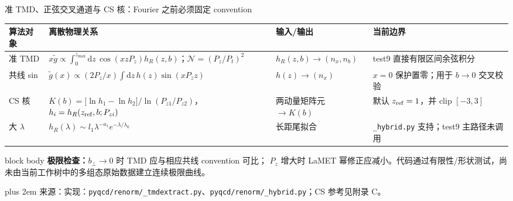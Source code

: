 \documentclass[UTF8,aspectratio=169,11pt]{ctexbeamer}
\newcommand{\source}[1]{%
  \par\vspace{0.02em}\begingroup\fontsize{6}{6.8}\selectfont\raggedright\sloppy
  \setlength{\emergencystretch}{3em}\rightskip=0pt plus 2em
  \color{muted}来源：#1\par\endgroup}
\newcommand{\dd}{\mathrm{d}}
\begin{document}
\begin{frame}[t]{准 TMD、正弦交叉通道与 CS 核：Fourier 之前必须固定 convention}
  \scriptsize
  \begin{tabularx}{0.98\textwidth}{@{}p{}Yp{0.16\textwidth}Y@{}}
    \toprule
    算法对象 & 离散物理关系 & 输入/输出 & 当前边界\\
    \midrule
    准 TMD & \(x\widetilde g\propto\int_0^{z_{\max}}\!\dd z\,\cos(xzP_z)h_R(z,b)\)；\(\mathcal N=(P_z/P_t)^2\) & \(h_R(z,b)\to(n_x,n_b)\) & test9 直接有限区间余弦积分\\
    共线 sin & \(\widetilde g(x)\propto(2P_z/x)\int\dd z\,h(z)\sin(xP_zz)\) & \(h(z)\to(n_x)\) & \(x=0\) 保护置零；用于 \(b\to0\) 交叉校验\\
    CS 核 & \(K(b)=\bigl[\ln h_1-\ln h_2\bigr]/\ln(P_{z1}/P_{z2})\)，\(h_i=h_R(z_{\rm ref},b;P_{zi})\) & 两动量矩阵元 \(\to K(b)\) & 默认 \(z_{\rm ref}=1\)，并 clip \([-3,3]\)\\
    大 \(\lambda\) & \(h_R(\lambda)\sim l_1\lambda^{-a_1}e^{-\lambda/\lambda_0}\) & 长距尾拟合 & \texttt{\_hybrid.py} 支持；test9 主路径未调用\\
    \bottomrule
  \end{tabularx}
  \vfill
  \begin{beamercolorbox}[wd=0.98\textwidth,sep=0.55em,rounded=true]{block body}
    \textbf{极限检查：}\(b_\perp\to0\) 时 TMD 应与相应共线 convention 可比；
    \(P_z\) 增大时 LaMET 幂修正应减小。代码通过有限性/形状测试，尚未由当前工作树中的多组态原始数据建立连续极限曲线。
  \end{beamercolorbox}
  \source{实现：\nolinkurl{pyqcd/renorm/_tmdextract.py}、\nolinkurl{pyqcd/renorm/_hybrid.py}；CS 参考见附录 C。}
\end{frame}
\end{document}
